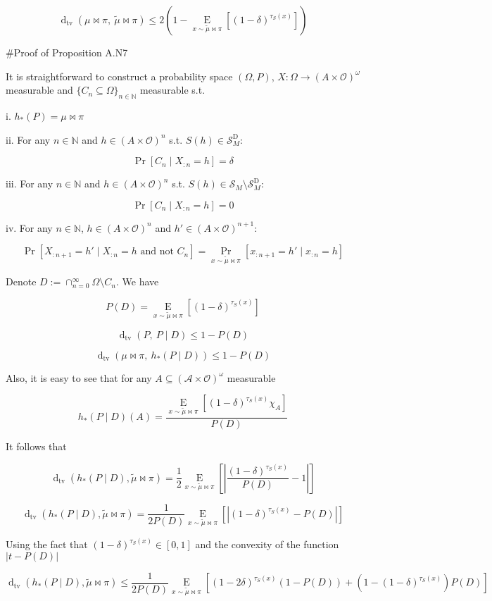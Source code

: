 \documentclass[a4paper]{article}
\newcommand{\AP}[1]{\left(#1\right)}
\newcommand{\AB}[1]{\left[#1\right]}
\newcommand{\Pa}[2]{\underset{#1}{\operatorname{Pr}}\AB{#2}}
\newcommand{\Ea}[2]{\underset{#1}{\operatorname{E}}\AB{#2}}
\newcommand{\Dtva}[1]{\operatorname{d}_{\text{tv}}\AP{#1}}
\newcommand{\Nats}{\mathbb{N}}
\newcommand{\Sq}[2]{\{#1\}_{#2 \in \Nats}}
\newcommand{\Sqn}[1]{\Sq{#1}{n}}
\newcommand{\Abs}[1]{\left\vert #1 \right\vert}
\newcommand{\Ob}{\mathcal{O}}
\newcommand{\A}{\mathcal{A}}
\newcommand{\St}{\mathcal{S}}
\newcommand{\RMD}{\mathrm{D}}
\newcommand{\SD}{\St^{\RMD}}
\begin{document}
$$\Dtva{\mu\bowtie\pi,\ \tilde{\mu}\bowtie\pi} \leq 2\AP{1-\Ea{x\sim\tilde{\mu}\bowtie\pi}{\AP{1-\delta}^{\tau_S(x)}}}$$

\#Proof of Proposition A.N7

It is straightforward to construct a probability space $(\Omega,P)$, $X: \Omega \rightarrow (A \times \Ob)^\omega$ measurable and $\Sqn{C_n \subseteq \Omega}$ measurable s.t.

i. $h_*(P) = \mu\bowtie\pi$

ii. For any $n \in \Nats$ and $h \in (A \times \Ob)^n$ s.t. $S(h) \in \SD_M$: 

$$\Pa{}{C_n \mid X_{:n} = h} = \delta$$

iii. For any $n \in \Nats$ and $h \in (A \times \Ob)^n$ s.t. $S(h) \in \St_M \setminus \SD_M$: 

$$\Pa{}{C_n \mid X_{:n} = h} = 0$$

iv. For any $n \in \Nats$, $h \in (A \times \Ob)^n$ and $h' \in (A \times \Ob)^{n+1}$:

$$\Pa{}{X_{:n+1}=h' \mid X_{:n} = h \text{ and not } C_n} = \Pa{x \sim \tilde{\mu}\bowtie\pi}{x_{:n+1}=h' \mid x_{:n} = h}$$

Denote $D:=\cap_{n=0}^\infty \Omega \setminus C_n$. We have

$$P(D) = \Ea{x\sim\tilde{\mu}\bowtie\pi}{\AP{1-\delta}^{\tau_S(x)}}$$

$$\Dtva{P,\ P \mid D} \leq 1 - P(D)$$

$$\Dtva{\mu\bowtie\pi,\ h_*\AP{P \mid D}} \leq 1 - P(D)$$

Also, it is easy to see that for any $A \subseteq (\A \times \Ob)^\omega$ measurable

$$h_*\AP{P \mid D}(A)=\frac{\Ea{x\sim\tilde{\mu}\bowtie\pi}{\AP{1-\delta}^{\tau_S(x)}\chi_A}}{P(D)}$$

It follows that

$$\Dtva{h_*\AP{P \mid D},\tilde{\mu}\bowtie\pi} = \frac{1}{2}\Ea{x\sim\tilde{\mu}\bowtie\pi}{\Abs{\frac{\AP{1-\delta}^{\tau_S(x)}}{P(D)}-1}}$$

$$\Dtva{h_*\AP{P \mid D},\tilde{\mu}\bowtie\pi} = \frac{1}{2P(D)}\Ea{x\sim\tilde{\mu}\bowtie\pi}{\Abs{\AP{1-\delta}^{\tau_S(x)}-P(D)}}$$

Using the fact that $\AP{1-\delta}^{\tau_S(x)}\in[0,1]$ and the convexity of the function $\Abs{t-P(D)}$

$$\Dtva{h_*\AP{P \mid D},\tilde{\mu}\bowtie\pi} \leq \frac{1}{2P(D)}\Ea{x\sim\tilde{\mu}\bowtie\pi}{\AP{1-2\delta}^{\tau_S(x)}\AP{1-P(D)}+\AP{1-\AP{1-\delta}^{\tau_S(x)}}P(D)}$$
\end{document}
